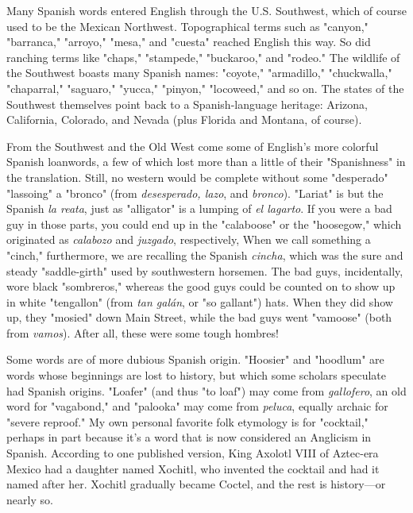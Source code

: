 Many Spanish words entered English through the U.S. Southwest, which of course used to be the Mexican Northwest. Topographical terms such as "canyon," "barranca," "arroyo," "mesa," and "cuesta"
reached English this way. So did ranching terms like "chaps," "stampede," "buckaroo," and "rodeo." The wildlife of the Southwest boasts
many Spanish names: "coyote," "armadillo," "chuckwalla," "chaparral," "saguaro," "yucca," "pinyon," "locoweed," and so on. The states
of the Southwest themselves point back to a Spanish-language heritage: Arizona, California, Colorado, and Nevada (plus Florida and Montana, of course).

From the Southwest and the Old West come some of English's
more colorful Spanish loanwords, a few of which lost more than a
little of their "Spanishness" in the translation. Still, no western would
be complete without some "desperado" "lassoing" a "bronco" (from
\emph{desesperado, lazo}, and \emph{bronco}). "Lariat" is but the Spanish \emph{la reata},
just as "alligator" is a lumping of \emph{el lagarto}. If you were a bad guy in
those parts, you could end up in the "calaboose" or the "hoosegow,"
which originated as \emph{calabozo} and \emph{juzgado}, respectively, When we
call something a "cinch," furthermore, we are recalling the Spanish
\emph{cincha}, which was the sure and steady "saddle-girth" used by southwestern horsemen. The bad guys, incidentally, wore black "sombreros,"
whereas the good guys could be counted on to show up in white "tengallon" (from \emph{tan galán}, or "so gallant") hats. When they did show up,
they "mosied" down Main Street, while the bad guys went "vamoose"
(both from \emph{vamos}). After all, these were some tough hombres!

Some words are of more dubious Spanish origin. "Hoosier" and
"hoodlum" are words whose beginnings are lost to history, but which
some scholars speculate had Spanish origins. "Loafer" (and thus "to
loaf") may come from \emph{gallofero}, an old word for "vagabond," and "palooka" may come from \emph{peluca}, equally archaic for "severe reproof."
My own personal favorite folk etymology is for "cocktail," perhaps in
part because it's a word that is now considered an Anglicism in Spanish. According to one published version, King Axolotl VIII of Aztec-era
Mexico had a daughter named Xochitl, who invented the cocktail and
had it named after her. Xochitl gradually became Coctel, and the rest is
history---or nearly so.


